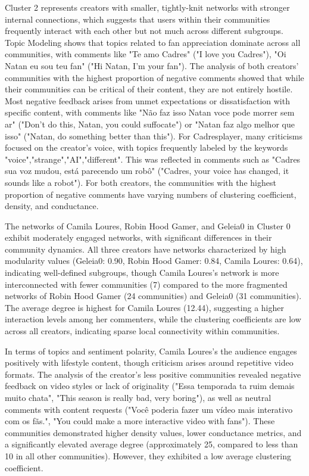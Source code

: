 \documentclass[sigconf]{acmart}
\begin{document}
Cluster 2 represents creators with smaller, tightly-knit networks with stronger internal connections,
which suggests that users within their communities frequently interact with each other but not much across
different subgroups. Topic Modeling shows that topics related to fan appreciation dominate across 
all communities, with comments like "Te amo Cadres" ("I love you Cadres"), "Oi Natan eu sou teu fan"
("Hi Natan, I'm your fan"). 
The analysis of both creators' communities with the highest proportion of negative comments showed that
while their communities can be critical of their content, they are not entirely hostile.
Most negative feedback arises from unmet expectations or dissatisfaction with specific content, 
with comments like "Não faz isso Natan voce pode morrer sem ar" ("Don't do this, Natan, you could suffocate")
or "Natan faz algo melhor que isso" ("Natan, do something better than this"). 
For Cadresplayer, many criticisms focused on the creator's voice, with topics frequently labeled by
the keywords "voice","strange","AI","different". This was reflected in comments such as "Cadres sua voz 
mudou, está parecendo um robô" ("Cadres, your voice has changed, it sounds like a robot").
For both creators, the communities with the highest proportion of negative comments have varying numbers
of clustering coefficient, density, and conductance.

The networks of Camila Loures, Robin Hood Gamer, and Geleia0 in Cluster 0 exhibit 
moderately engaged networks, with significant differences in their community dynamics. 
All three creators have networks characterized by high modularity values (Geleia0: 0.90, Robin Hood Gamer: 
0.84, Camila Loures: 0.64), indicating well-defined subgroups, though Camila Loures’s network is 
more interconnected with fewer communities (7) compared to the more fragmented networks of Robin Hood Gamer 
(24 communities) and Geleia0 (31 communities). 
The average degree is highest for Camila Loures (12.44), suggesting a higher 
interaction levels among her commenters, while the clustering coefficients are low across all creators, 
indicating sparse local connectivity within communities. 

In terms of topics and sentiment polarity, Camila Loures's 
the audience engages positively with lifestyle content, though criticism arises around repetitive 
video formats.
The analysis of the creator's less positive communities revealed negative feedback on 
video styles or lack of originality ("Essa temporada ta ruim demais muito chata", "This season is really bad, very boring"), 
as well as neutral comments with content requests ("Você poderia fazer um vídeo mais interativo com os fãs.", 
"You could make a more interactive video with fans").
These communities demonstrated higher density values, lower conductance metrics, and a significantly 
elevated average degree (approximately 25, compared to less than 10 in all other communities). 
However, they exhibited a low average clustering coefficient.
\end{document}
